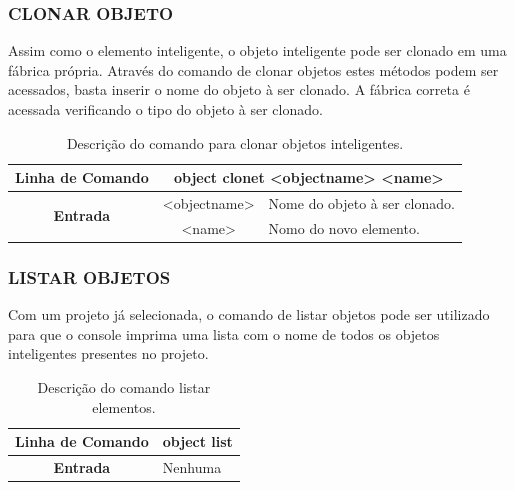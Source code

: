 \documentclass[a4paper,12pt]{monografia}
\theoremstyle{plain}
\theoremstyle{definition}
\theoremstyle{remark}
\begin{document}
\subsubsection{CLONAR OBJETO}\label{sec:clone_object}

Assim como o elemento inteligente, o objeto inteligente pode ser clonado em uma fábrica própria. Através do comando de clonar objetos estes métodos podem ser acessados, basta inserir o nome do objeto à ser clonado. A fábrica correta é acessada verificando o tipo do objeto à ser clonado.

\begin{center}
	\begin{table}[!htbp]
		\begin{tabular}{|c|c|m{}|}
			\hline
			\textbf{Linha de Comando} & \multicolumn{2}{c|}{object clonet <object\underline{\space\space}name> <name>} \\
			\hline
			\multirow{2}{*}{\textbf{Entrada}} & <object\underline{\space\space}name> & Nome do objeto à ser clonado. \\
			
			& <name> & Nomo do novo elemento. \\
			\hline
		\end{tabular}
		\caption{Descrição do comando para clonar objetos inteligentes.}
		\label{tab:clone_object}
	\end{table}
\end{center}

\subsubsection{LISTAR OBJETOS}\label{sec:list_object}

Com um projeto já selecionada, o comando de listar objetos pode ser utilizado para que o console imprima uma lista com o nome de todos os objetos inteligentes presentes no projeto.

\begin{center}
	\begin{table}[!htbp]
		\begin{tabular}{|c|m{}|}
			\hline
			\textbf{Linha de Comando} & \multicolumn{1}{c|}{object list} \\
			\hline
			\textbf{Entrada} & Nenhuma \\
			\hline
		\end{tabular}
		\caption{Descrição do comando listar elementos.}
		\label{tab:list_object}
	\end{table}
\end{center}
\end{document}
